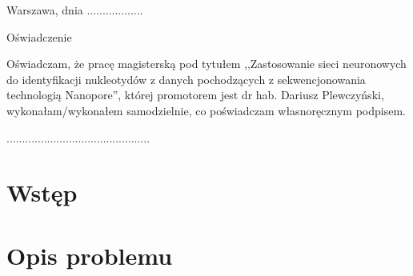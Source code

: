 \documentclass[a4paper,11pt,twoside]{report}
\theoremstyle{definition}
\newcommand{\tytul}{Zastosowanie sieci neuronowych do identyfikacji nukleotydów z danych pochodzących z sekwencjonowania technologią Nanopore}
\newcommand{\type}{magisters} %
\newcommand{\supervisor}{dr hab. Dariusz Plewczyński}
\begin{document}


\null\thispagestyle{empty}\newpage

\null \hfill Warszawa, dnia ..................\\

\par\vspace{5cm}

\begin{center}
Oświadczenie
\end{center}

\indent Oświadczam, że pracę \type ką pod
tytułem ,,\tytul '', której promotorem jest \supervisor , wykonałam/wykonałem
samodzielnie, co poświadczam własnoręcznym podpisem.
\vspace{2cm}


\begin{flushright}
  \begin{minipage}{50mm}
    \begin{center}
      ..............................................

    \end{center}
  \end{minipage}
\end{flushright}

\thispagestyle{empty}
\newpage

\null\thispagestyle{empty}\newpage


\tableofcontents
\thispagestyle{empty}

\newpage %

\null\thispagestyle{empty}\newpage
\pagestyle{fancy}
\setcounter{page}{12} %

\chapter{Wstęp}

\chapter{Opis problemu}
\end{document}
